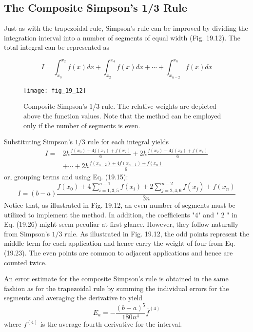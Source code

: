 \documentclass[../main.tex]{subfiles}
\begin{document}
	\subsection{The Composite Simpson's 1/3 Rule}
	Just as with the trapezoidal rule, Simpson's rule can be improved by dividing the integration interval into a number of segments of equal width (Fig. 19.12). The total integral can
	be represented as

	\begin{equation}
		\tag{19.25}
		I=\int_{x_{0}}^{x_{2}} f(x) d x+\int_{x_{2}}^{x_{4}} f(x) d x+\cdots+\int_{x_{n-2}}^{x_{n}} f(x) d x
		\end{equation}

		\begin{figure}[H]
			\centering
			\texttt{[image: fig\_19\_12]}
		   \caption{\textsf{Composite Simpson's 1/3 rule. The relative weights are depicted above the function values.
		   Note that the method can be employed only if the number of segments is even.}}\label{fig:fig_19_12}
		\end{figure}


		Substituting Simpson's $1 / 3$ rule for each integral yields
		$$
		\begin{aligned}
		I=& 2 h \frac{f\left(x_{0}\right)+4 f\left(x_{1}\right)+f\left(x_{2}\right)}{6}+2 h \frac{f\left(x_{2}\right)+4 f\left(x_{3}\right)+f\left(x_{4}\right)}{6} \\
		&+\cdots+2 h \frac{f\left(x_{n-2}\right)+4 f\left(x_{n-1}\right)+f\left(x_{n}\right)}{6}
		\end{aligned}
		$$
		or, grouping terms and using Eq. (19.15):
		\begin{equation}
			\tag{19.26}
		I=(b-a) \frac{f\left(x_{0}\right)+4 \sum_{i=1,3,5}^{n-1} f\left(x_{i}\right)+2 \sum_{j=2,4,6}^{n-2} f\left(x_{j}\right)+f\left(x_{n}\right)}{3 n}
	\end{equation}
		Notice that, as illustrated in Fig. 19.12, an even number of segments must be utilized to implement the method. In addition, the coefficients "4" and " 2 " in Eq. (19.26) might seem peculiar at first glance. However, they follow naturally from Simpson's $1 / 3$ rule. As illustrated in Fig. 19.12, the odd points represent the middle term for each application and hence carry the weight of four from Eq. (19.23). The even points are common to adjacent applications and hence are counted twice.
		
		An error estimate for the composite Simpson's rule is obtained in the same fashion as for the trapezoidal rule by summing the individual errors for the segments and averaging the derivative to yield
		\begin{equation}
			\tag{19.27}
		E_{a}=-\frac{(b-a)^{5}}{180 n^{4}} \bar{f}^{(4)}
	\end{equation}
		where $f^{(4)}$ is the average fourth derivative for the interval.
\end{document}
